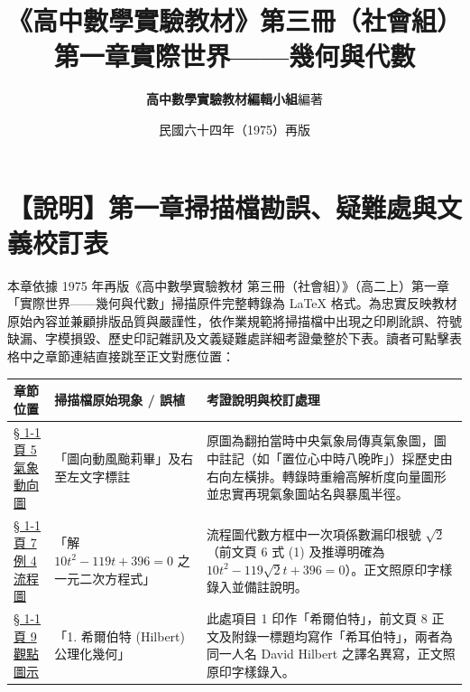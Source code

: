 \documentclass[a4paper,12pt,twoside]{article}
\title{\LARGE\textbf{《高中數學實驗教材》第三冊（社會組）}\\[0.5em] \Large\textbf{第一章\quad 實際世界——幾何與代數}}
\author{\textbf{高中數學實驗教材編輯小組}\quad 編著}
\date{民國六十四年（1975）再版}
\begin{document}
\maketitle
\thispagestyle{firstpage}

\section*{【說明】第一章掃描檔勘誤、疑難處與文義校訂表}
\label{sec:errata_notes_b3_ch1}
\label{sec:current_errata}

本章依據 1975 年再版《高中數學實驗教材 第三冊（社會組）》（高二上）第一章「實際世界——幾何與代數」掃描原件完整轉錄為 \LaTeX{} 格式。為忠實反映教材原始內容並兼顧排版品質與嚴謹性，依作業規範將掃描檔中出現之印刷訛誤、符號缺漏、字模損毀、歷史印記雜訊及文義疑難處詳細考證彙整於下表。讀者可點擊表格中之章節連結直接跳至正文對應位置：

\begin{table}[H]
\centering
\small
\renewcommand{\arraystretch}{1.35}
\begin{tabularx}{\textwidth}{|p{3.2cm}|p{3.6cm}|X|}
\hline
\textbf{章節位置} & \textbf{掃描檔原始現象 / 誤植} & \textbf{考證說明與校訂處理} \\ \hline

\hyperref[note:b3s-ch1-p5-typhoon-map]{§ 1-1 頁 5 氣象動向圖} & 
「圖向動風颱莉畢」及右至左文字標註 & 
原圖為翻拍當時中央氣象局傳真氣象圖，圖中註記（如「置位心中時八晚昨」）採歷史由右向左橫排。轉錄時重繪高解析度向量圖形並忠實再現氣象圖站名與暴風半徑。 \\ \hline

\hyperref[note:b3s-ch1-p7-flowchart-sqrt2]{§ 1-1 頁 7 例 4 流程圖} & 
「解 $10t^2 - 119t + 396 = 0$ 之一元二次方程式」 & 
流程圖代數方框中一次項係數漏印根號 $\sqrt{2}$（前文頁 6 式 (1) 及推導明確為 $10t^2 - 119\sqrt{2}t + 396 = 0$）。正文照原印字樣錄入並備註說明。 \\ \hline

\hyperref[note:b3s-ch1-p9-hilbert-name]{§ 1-1 頁 9 觀點圖示} & 
「1. 希爾伯特 (Hilbert) 公理化幾何」 & 
此處項目 1 印作「希爾伯特」，前文頁 8 正文及附錄一標題均寫作「希耳伯特」，兩者為同一人名 David Hilbert 之譯名異寫，正文照原印字樣錄入。 \\ \hline

\end{tabularx}
\end{table}

\clearpage
\tableofcontents
\newpage


\end{document}
